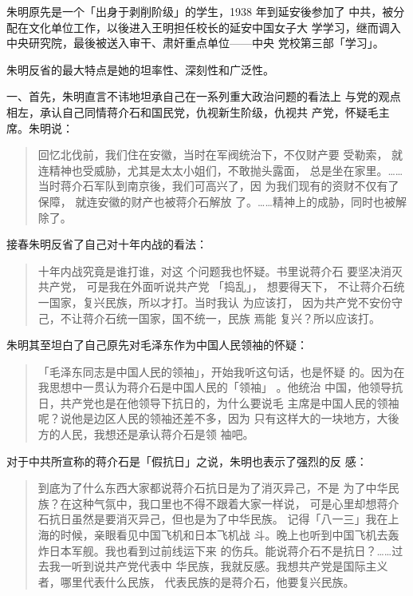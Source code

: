 朱明原先是一个「出身于剥削阶级」的学生，1938 年到延安後参加了
中共，被分配在文化单位工作，以後进入王明担任校长的延安中国女子大
学学习，继而调入中央研究院，最後被送入审干、肃奸重点单位——中央
党校第三部「学习」。

朱明反省的最大特点是她的坦率性、深刻性和广泛性。

一、首先，朱明直言不讳地坦承自己在一系列重大政治问题的看法上
与党的观点相左，承认自己同情蒋介石和国民党，仇视新生阶级，仇视共
产党，怀疑毛主席。朱明说：
\begin{quote}
	
{\fzwkai 回忆北伐前，我们住在安徽，当时在军阀统治下，不仅财产要 受勒索，
就连精神也受威胁，尤其是太太小姐们，不敢抛头露面， 总是坐在家里。……
当时蒋介石军队到南京後，我们可高兴了，因 为我们现有的资财不仅有了保障，
就连安徽的财产也被蒋介石解放 了。……精神上的成胁，同时也被解除了。}
\end{quote}

接春朱明反省了自己对十年内战的看法：
\begin{quote}
	
{\fzwkai 十年内战究竟是谁打谁，对这
个问题我也怀疑。书里说蒋介石 要坚决消灭共产党， 可是我在外面听说共产党
「捣乱」， 想要得天下， 不让蒋介石统一国家，复兴民族，所以才打。当时我认
为应该打， 因为共产党不安份守己，不让蒋介石统一国家，国不统一，民族 焉能
复兴？所以应该打。} 
\end{quote}
 
朱明其至坦白了自己原先对毛泽东作为中国人民领袖的怀疑：
\begin{quote}
	
{\fzwkai 「毛泽东同志是中国人民的领袖」，开始我听这句话，也是怀疑
的。因为在我思想中一贯认为蒋介石是中国人民的「领袖」
。他统治
中国，他领导抗日，共产党也是在他领导下抗日的，为什么要说毛
主席是中国人民的领袖呢？说他是边区人民的领袖还差不多，因为
只有这样大的一块地方，大後方的人民，我想还是承认蒋介石是领
袖吧。} 
\end{quote}

对于中共所宣称的蒋介石是「假抗日」之说，朱明也表示了强烈的反
感：
\begin{quote}
	
{\fzwkai 到底为了什么东西大家都说蒋介石抗日是为了消灭异己，不是
为了中华民族？在这种气氛中，我口里也不得不跟着大家一样说，
可是心里却想蒋介石抗日虽然是要消灭异己，但也是为了中华民族。
记得「八一三」我在上海的时候，亲眼看见中国飞机和日本飞机战
斗。晚上也听到中国飞机去轰炸日本军舰。我也看到过前线运下来
的伤兵。能说蒋介石不是抗日？……过去我一听到说共产党代表中
华民族，我就反感。我想共产党是国际主义者，哪里代表什么民族，
代表民族的是蒋介石，他要复兴民族。} 
\end{quote}

